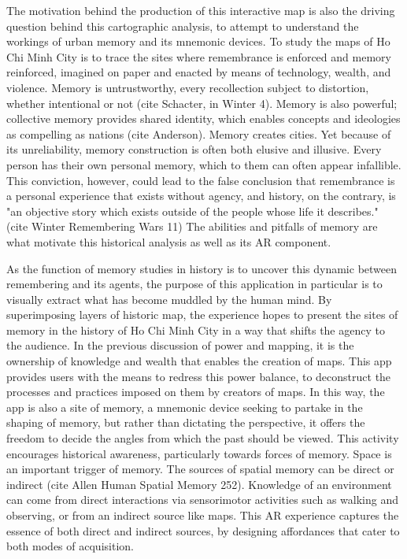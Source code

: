 The motivation behind the production of this interactive map is also the driving question behind this cartographic analysis, to  attempt to understand the workings of urban memory and its mnemonic devices. To study the maps of Ho Chi Minh City is to trace the sites where remembrance is enforced and memory reinforced, imagined on paper and enacted by means of technology,  wealth, and violence. Memory is untrustworthy, every recollection subject to distortion, whether intentional or not (cite Schacter, in Winter 4). Memory is also powerful; collective memory provides shared identity, which enables concepts and ideologies as compelling as nations (cite Anderson). Memory creates cities. Yet because of its unreliability, memory construction is often both elusive and illusive. Every person has their own personal memory, which to them can often appear infallible. This conviction, however, could lead to the false conclusion that remembrance is a personal experience that exists without agency, and history, on the contrary, is "an objective story which exists outside of the people whose life it describes." (cite Winter Remembering Wars 11) The abilities and pitfalls of memory are what motivate this historical analysis as well as its AR component.

As the function of memory studies in history is to uncover this dynamic between remembering and its agents, the purpose of this application in particular is to visually extract what has become muddled by the human mind. By superimposing layers of historic map, the experience hopes to present the sites of memory in the history of Ho Chi Minh City in a way that shifts the agency to the audience. In the previous discussion of power and mapping, it is the ownership of knowledge and wealth that enables the creation of maps. This app provides users with the means to redress this power balance, to deconstruct the processes and practices imposed on them by creators of maps. In this way, the app is also a site of memory, a mnemonic device seeking to partake in the shaping of memory, but rather than dictating the perspective, it offers the freedom to decide the angles from which the past should be viewed. This activity encourages historical awareness, particularly towards forces of memory. Space is an important trigger of memory. The sources of spatial memory can be direct or indirect (cite Allen Human Spatial Memory 252). Knowledge of an environment can come from direct interactions via sensorimotor activities such as walking and observing, or from an indirect source like maps. This AR experience captures the essence of both direct and indirect sources, by designing affordances that cater to both modes of acquisition.

